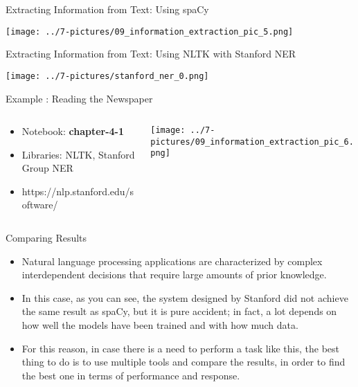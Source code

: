 \documentclass[11pt]{beamer}
\begin{document}
\begin{frame}{Extracting Information from Text: Using spaCy}
	\begin{center}
	\texttt{[image: ../7-pictures/09\_information\_extraction\_pic\_5.png]}
	\end{center}
\end{frame}
\begin{frame}{\small Extracting Information from Text: Using NLTK with Stanford NER}
	\begin{center}
	\texttt{[image: ../7-pictures/stanford\_ner\_0.png]}
	\end{center}
\end{frame}
\begin{frame}{Example : Reading the Newspaper }
\begin{columns}[T] %
\begin{column}{.48\textwidth}
        \begin{itemize}
		\item Notebook: \textbf{chapter-4-1}
		\item Libraries: NLTK, Stanford Group NER
		\item https://nlp.stanford.edu/software/
        \end{itemize}
\end{column}%
\hfill%
\begin{column}{.48\textwidth}
        \texttt{[image: ../7-pictures/09\_information\_extraction\_pic\_6.png]}
\end{column}%
\end{columns}
\end{frame}
\begin{frame}{Comparing Results}

\begin{itemize}
\item Natural language processing applications are characterized by complex interdependent decisions that require large amounts of prior knowledge. 
\item In this case, as you can see, the system designed by Stanford did not achieve the same result as spaCy, but it is pure accident; in fact, a lot depends on how well the models have been trained and with how much data. 
\item For this reason, in case there is a need to perform a task like this, the best thing to do is to use multiple tools and compare the results, in order to find the best one in terms of performance and response.
\end{itemize}
\end{frame}
\end{document}
